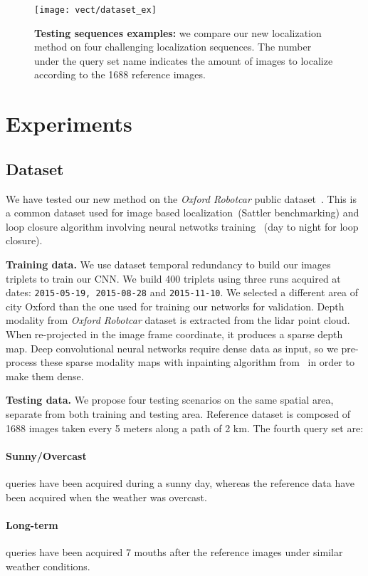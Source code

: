 \begin{figure}
	\center
	\texttt{[image: vect/dataset\_ex]}
	\caption{\label{fig:dataset} \textbf{Testing sequences examples:} we compare our new localization method on four challenging localization sequences. The number under the query set name indicates the amount of images to localize according to the 1688 reference images.}
\end{figure}

\section{Experiments}
\label{sec:experiments}

\subsection{Dataset}
\label{subsec:dataset}
	We have tested our new method on the \textit{Oxford Robotcar} public dataset~\cite{Maddern2016}. This is a common dataset used for image based localization~\cite{}(Sattler benchmarking) and loop closure algorithm involving neural netwotks training~\cite{} (day to night for loop closure).
		
\noindent\textbf{Training data.}
	We use dataset temporal redundancy to build our images triplets to train our CNN. We build 400 triplets using three runs acquired at dates: \texttt{2015-05-19, 2015-08-28} and \texttt{2015-11-10}. We selected a different area of city Oxford than the one used for training our networks for validation.
	Depth modality from \textit{Oxford Robotcar} dataset is extracted from the lidar point cloud. When re-projected in the image frame coordinate, it produces a sparse depth map. Deep convolutional neural networks require dense data as input, so we pre-process these sparse modality maps with inpainting algorithm from~\cite{Bevilacqua2017} in order to make them dense.

\noindent\textbf{Testing data.} We propose four testing scenarios on the same spatial area, separate from both training and testing area. Reference dataset is composed of 1688 images taken every 5 meters along a path of 2 km. The fourth query set are:
	\paragraph{Sunny/Overcast} queries have been acquired during a sunny day, whereas the reference data have been acquired when the weather was overcast.
	\paragraph{Long-term} queries have been acquired 7 mouths after the reference images under similar weather conditions.
